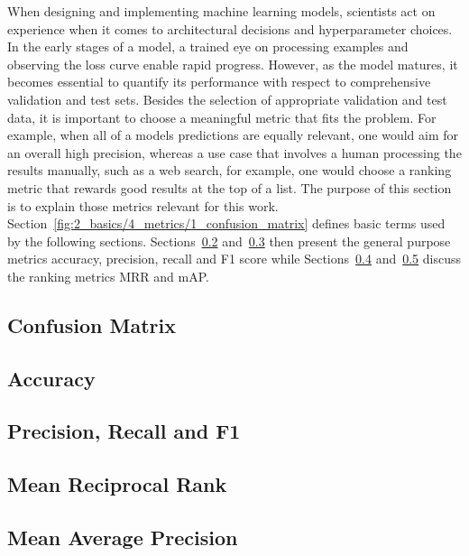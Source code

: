 When designing and implementing machine learning models, scientists act on experience when it comes to architectural decisions and hyperparameter choices. In the early stages of a model, a trained eye on processing examples and observing the loss curve enable rapid progress. However, as the model matures, it becomes essential to quantify its performance with respect to comprehensive validation and test sets. Besides the selection of appropriate validation and test data, it is important to choose a meaningful metric that fits the problem. For example, when all of a models predictions are equally relevant, one would aim for an overall high precision, whereas a use case that involves a human processing the results manually, such as a web search, for example, one would choose a ranking metric that rewards good results at the top of a list. The purpose of this section is to explain those metrics relevant for this work. Section~\ref{fig:2_basics/4_metrics/1_confusion_matrix} defines basic terms used by the following sections. Sections~\ref{subsec:2_basics/4_metrics/2_accuracy} and~\ref{subsec:2_basics/4_metrics/3_prf} then present the general purpose metrics accuracy, precision, recall and F1 score while Sections~\ref{subsec:2_basics/4_metrics/4_mrr} and~\ref{subsec:2_basics/4_metrics/5_map} discuss the ranking metrics MRR and mAP\@.

\subsection{Confusion Matrix}
\label{subsec:2_basics/4_metrics/1_confusion_matrix}


\subsection{Accuracy}
\label{subsec:2_basics/4_metrics/2_accuracy}


\subsection{Precision, Recall and F1}
\label{subsec:2_basics/4_metrics/3_prf}


\subsection{Mean Reciprocal Rank}
\label{subsec:2_basics/4_metrics/4_mrr}


\subsection{Mean Average Precision}
\label{subsec:2_basics/4_metrics/5_map}

